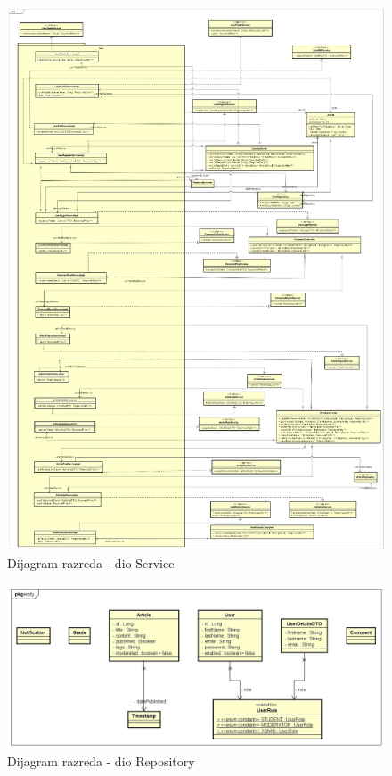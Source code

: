 \begin{figure}[H]
	\includegraphics[scale=0.5]{slike/DijagramRazreda3.jpg}
	\centering
	\caption{Dijagram razreda - dio Service}
	\label{fig:class_diagram_service}
\end{figure}

\eject

\begin{figure}[H]
	\includegraphics[scale=0.4]{slike/DijagramRazreda4.jpg}
	\centering
	\caption{Dijagram razreda - dio Repository}
	\label{fig:class_diagram_repository}
\end{figure}

